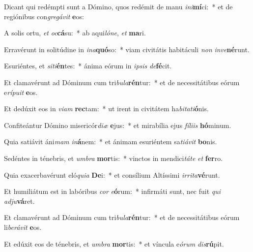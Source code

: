 \item Dicant qui redémpti sunt a Dómino, quos redémit de manu \textit{in}\textit{i}\textbf{mí}ci:~* et de regiónibus con\textit{gre}\textit{gá}\textit{vit} \textbf{e}os:
\item A solis ortu, \textit{et} \textit{oc}\textbf{cá}su:~* ab aqui\textit{ló}\textit{ne}, \textit{et} \textbf{ma}ri.
\item Erravérunt in solitúdine in \textit{in}\textit{a}\textbf{quó}so:~* viam civitátis habitáculi \textit{non} \textit{in}\textit{ve}\textbf{né}runt.
\item Esuriéntes, et \textit{si}\textit{ti}\textbf{én}tes:~* ánima eórum in \textit{ip}\textit{sis} \textit{de}\textbf{fé}cit.
\item Et clamavérunt ad Dóminum cum tri\textit{bu}\textit{la}\textbf{rén}tur:~* et de necessitátibus eórum e\textit{rí}\textit{pu}\textit{it} \textbf{e}os.
\item Et dedúxit eos in \textit{vi}\textit{am} \textbf{rec}tam:~* ut irent in civitátem ha\textit{bi}\textit{ta}\textit{ti}\textbf{ó}nis.
\item Confiteántur Dómino misericór\textit{di}\textit{æ} \textbf{e}jus:~* et mirabília ejus \textit{fí}\textit{li}\textit{is} \textbf{hó}minum.
\item Quia satiávit áni\textit{mam} \textit{in}\textbf{á}nem:~* et ánimam esuriéntem sa\textit{ti}\textit{á}\textit{vit} \textbf{bo}nis.
\item Sedéntes in ténebris, et \textit{um}\textit{bra} \textbf{mor}tis:~* vinctos in mendici\textit{tá}\textit{te} \textit{et} \textbf{fer}ro.
\item Quia exacerbavérunt eló\textit{qui}\textit{a} \textbf{De}i:~* et consílium Altíssimi \textit{ir}\textit{ri}\textit{ta}\textbf{vé}runt.
\item Et humiliátum est in labóribus \textit{cor} \textit{e}\textbf{ó}rum:~* infirmáti sunt, nec fuit \textit{qui} \textit{ad}\textit{ju}\textbf{vá}ret.
\item Et clamavérunt ad Dóminum cum tri\textit{bu}\textit{la}\textbf{rén}tur:~* et de necessitátibus eórum li\textit{be}\textit{rá}\textit{vit} \textbf{e}os.
\item Et edúxit eos de ténebris, et \textit{um}\textit{bra} \textbf{mor}tis:~* et víncula e\textit{ó}\textit{rum} \textit{dis}\textbf{rú}pit.
